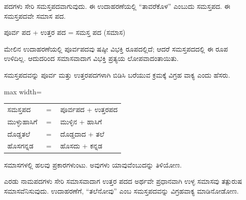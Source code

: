 \kbvcontinued ಪದಗಳು ಸೇರಿ ಸಮಸ್ತಪದವಾಗುವುದು. ಈ ಉದಾಹರಣೆಯಲ್ಲಿ “ತಾವರೆಕೊಳ” ಎಂಬುದು ಸಮಸ್ತಪದ. ಈ ಸಮಸ್ತಪದವೇ ಸಮಾಸ ಪದ.\par

\indent ಪೂರ್ವ ಪದ + ಉತ್ತರ ಪದ = ಸಮಸ್ತ ಪದ (ಸಮಾಸ)\par

\indent ಮೇಲಿನ ಉದಾಹರಣೆಯಲ್ಲಿ ಪೂರ್ವಪದವು ಷಷ್ಠೀ ವಿಭಕ್ತಿ ರೂಪದಲ್ಲಿದೆ; ಆದರೆ ಸಮಸ್ತಪದದಲ್ಲಿ ಈ ರೂಪ ಉಳಿದಿಲ್ಲ. ಆದುದರಿಂದ ಸಮಾಸವಾದಾಗ ವಿಭಕ್ತಿ ಪ್ರತ್ಯಯ ಲೋಪವಾದಂತಾಯಿತು.\par

\begin{kbvrule}
\noindent\kbvbullet\hspace{0.5em}ಸಮಸ್ತಪದವನ್ನು ಪೂರ್ವ ಮತ್ತು ಉತ್ತರಪದಗಳಾಗಿ ಬಿಡಿಸಿ ಬರೆಯುವ ಕ್ರಮಕ್ಕೆ ವಿಗ್ರಹ ವಾಕ್ಯ ಎಂದು ಹೆಸರು.
\end{kbvrule}

\vspace{3pt plus 2pt}\noindent\hspace*{1.2em}\par\vspace{1pt}

\begin{kbvderiv}
\vspace{4pt plus 3pt minus 1pt}
\begin{center}\begin{adjustbox}{max width=\textwidth}
{\renewcommand{\arraystretch}{1.22}\setlength{\tabcolsep}{4pt}
\begin{tabular}{l c l}
ಸಮಸ್ತಪದ & {\color{kbvgrey}$=$} & ಪೂರ್ವಪದ + ಉತ್ತರಪದ \\
ಮುಳ್ಳುಹಾಸಿಗೆ & {\color{kbvgrey}$=$} & ಮುಳ್ಳಿನ + ಹಾಸಿಗೆ \\
ದೊಡ್ಡತಲೆ & {\color{kbvgrey}$=$} & ದೊಡ್ಡದಾದ + ತಲೆ \\
ಹೊಸಗನ್ನಡ & {\color{kbvgrey}$=$} & ಹೊಸದು + ಕನ್ನಡ \\
\end{tabular}}
\end{adjustbox}\end{center}
\vspace{4pt plus 3pt minus 1pt}
\end{kbvderiv}

\begin{kbvrule}
\noindent\kbvbullet\hspace{0.5em}ಸಮಾಸಗಳಲ್ಲಿ ಹಲವು ಪ್ರಕಾರಗಳುಂಟು. ಅವುಗಳು ಯಾವುವೆಂಬುದನ್ನು ತಿಳಿಯೋಣ.
\end{kbvrule}

\vspace{4pt plus 4pt minus 1pt}\hspace{0.5em}ಎರಡು ನಾಮಪದಗಳು ಸೇರಿ ಸಮಾಸವಾದಾಗ ಉತ್ತರ ಪದದ ಅರ್ಥವೇ ಪ್ರಧಾನವಾಗಿ ಉಳ್ಳ ಸಮಾಸವು ತತ್ಪುರುಷ ಸಮಾಸವೆನಿಸುವುದು. ಉದಾಹರಣೆಗೆ, “ತಲೆನೋವು” ಎಂಬ ಸಮಸ್ತಪದವನ್ನು ವಿಗ್ರಹವಾಕ್ಯ ಮಾಡಿನೋಡೋಣ.\par

